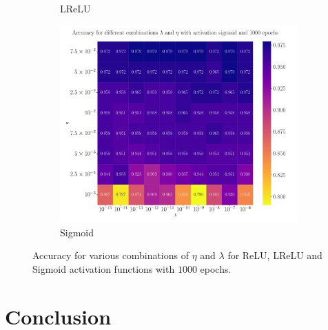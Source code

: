 \documentclass[%
reprint,
amsmath,amssymb,
aps,
]{revtex4-2}
\begin{document}
\begin{figure}
\begin{subfigure}{0.497\textwidth}
		\caption{LReLU}
		\label{fig:LReLU_heatmap}
	\end{subfigure}
	\hfill\newline
	\begin{subfigure}{0.497\textwidth}
		\includegraphics[width=\textwidth]{Python/Figures/accuracy_heatmap_sigmoid_epochs1000.pdf}
		\caption{Sigmoid}
		\label{fig:Sigmoid_heatmap}
	\end{subfigure}
	\caption{Accuracy for various combinations of $\eta$ and $\lambda$ for ReLU, LReLU and Sigmoid activation functions with $1000$ epochs.}
	\label{fig:FFNN_cancer_heatmaps}
\end{figure}

\section{Conclusion}



	
\end{document}
